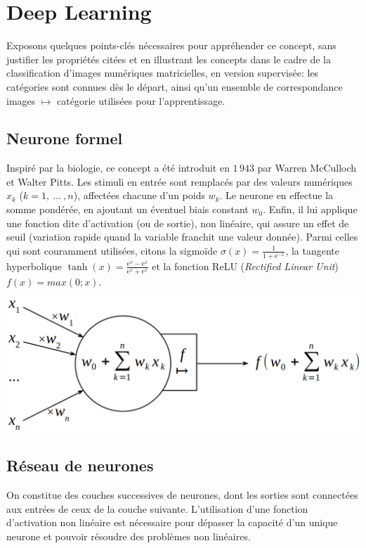 \documentclass[a4paper,11pt]{article} %
\newcommand{\e}{\text{e}}
\begin{document}
\section{Deep Learning}
Exposons quelques points-clés nécessaires pour appréhender ce concept, sans justifier les propriétés citées et en illustrant les concepts dans le cadre de la classification d'images numériques matricielles, en version supervisée: les catégories sont connues dès le départ, ainsi qu'un ensemble de correspondance \og images $\mapsto$ catégorie\fg{} utilisées pour l'apprentissage.
%
\subsection{Neurone formel}
%
Inspiré par la biologie, ce concept a été introduit en $1\,943$ par Warren McCulloch et Walter Pitts. Les stimuli en entrée sont remplacés par des valeurs numériques $x_k$ ($k=1,~...~, n$), affectées chacune d'un poids $w_k$. Le neurone en effectue la somme pondérée, en ajoutant un éventuel biais constant $w_0$. Enfin, il lui applique une fonction dite d'activation (ou de sortie), non linéaire, qui assure un effet de seuil (variation rapide quand la variable franchit une valeur donnée). Parmi celles qui sont couramment utilisées, citons la sigmoïde $\sigma(x)=\frac{1}{1+\e^{-x}}$, la tangente hyperbolique $\tanh(x)=\frac{\e^{x}-\e^{x}}{\e^{x}+\e^{x}}$ et la fonction ReLU (\emph{Rectified Linear Unit}) $f(x)=max(0;x)$.
\begin{center}
    \includegraphics[width=0.7\linewidth]{neurone.png}
\end{center}
%
\subsection{Réseau de neurones}
%
On constitue des couches successives de neurones, dont les sorties sont connectées aux entrées de ceux de la couche suivante.  L'utilisation d'une fonction d'activation non linéaire est nécessaire pour dépasser la capacité d'un unique neurone et pouvoir résoudre des problèmes non linéaires.
\end{document}
